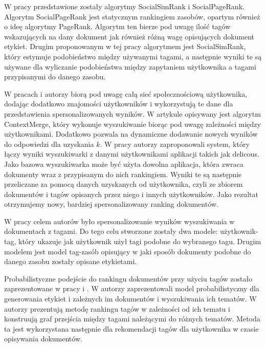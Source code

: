 W pracy \cite{bao2007social} przedstawione zostały algorytmy SocialSimRank i SocialPageRank. Algorytm SocialPageRank jest statycznym rankingiem zasobów, opartym również o ideę algorytmy PageRank. Algorytm ten bierze pod uwagę ilość tagów wskazujących na dany dokument jak również różną wagę opisujących dokument etykiet. Drugim proponowanym w tej pracy algorytmem jest SocialSimRank, który estymuje podobieństwo między używanymi tagami, a następnie wyniki te są używane dla wyliczanie podobieństwa między zapytaniem użytkownika a tagami przypisanymi do danego zasobu.

W pracach \cite{citeulike:3063696} i \cite{citeulike:3423905} autorzy biorą pod uwagę całą sieć społecznościową użytkownika, dodając dodatkowo znajomości użytkowników i wykorzystują te dane dla przedstawienia spersonalizowanych wyników. W artykule \cite{citeulike:3063696} opisywany jest algorytm ContextMerge, który wykonuje wyszukiwanie biorąc pod uwagę zależności między użytkownikami.  Dodatkowo pozwala na dynamiczne dodawanie nowych wyników do odpowiedzi dla uzyskania $k$. W pracy \cite{citeulike:3423905} autorzy zaproponowali system, który łączy wyniki wyszukiwarki z danymi użytkownikami aplikacji takich jak delicous. Jako bazowa wyszukiwarka może być użyta dowolna aplikacja, która zwraca dokumenty wraz z przypisanym do nich rankingiem. Wyniki te są następnie przeliczane za pomocą danych uzyskanych od użytkownika, czyli ze zbiorem dokumentów i tagów opisanych przez niego i innych użytkowników. Jako rezultat otrzymujemy nowy, bardziej spersonalizowany ranking dokumentów.

W pracy \cite{conf/mir/RawashdehKE11} celem autorów było spersonalizowanie wyników wyszukiwania w dokumentach z tagami. Do tego celu stworzone zostały dwa modele: użytkownik-tag, który ukazuje jak użytkownik użył tagi podobne do wybranego tagu. Drugim modelem jest model tag-zasób opisujący w jaki sposób dokumenty podobne do danego zasobu zostały opisane etykietami. 



Probabilistyczne podejście do rankingu dokumentów przy użyciu tagów zostało zaprezentowane w pracy \cite{citeulike:2775088} i \cite{citeulike:8846111}. W \cite{citeulike:2775088} autorzy zaprezentowali model probabilistyczny dla generowania etykiet i zależnych im dokumentów i wyszukiwania ich tematów. W \cite{citeulike:8846111} autorzy prezentują metodę rankingu tagów w zależności od ich tematu i konstruują graf przejścia między tagami należącymi do różnych tematów. Metoda ta jest wykorzystana następnie dla rekomendacji tagów dla użytkownika w czasie opisywania dokumentów. 








